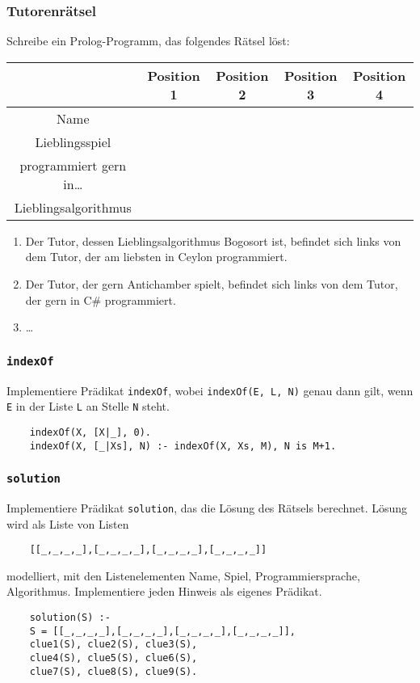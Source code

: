 \documentclass{beamer}
\date{2017-01-16/17}
\begin{document}
\normalsize
\normalem

\begin{frame}[plain]
  \titlepage
\end{frame}

\begin{frame}
  \frametitle{Tutorenrätsel}
  Schreibe ein Prolog-Programm, das folgendes Rätsel löst:
  \begin{table}
    \begin{tabular}{|c|c|c|c|c|}\hline
      & Position 1 & Position 2 & Position 3 & Position 4 \\\hline
      Name &&&& \\\hline
      Lieblingsspiel &&&& \\\hline
      programmiert gern in… &&&& \\\hline
      Lieblingsalgorithmus &&&& \\\hline
    \end{tabular}
  \end{table}
  \begin{enumerate}
  \item Der Tutor, dessen Lieblingsalgorithmus Bogosort ist, befindet sich links von dem Tutor, der am liebsten in Ceylon programmiert.
  \item Der Tutor, der gern Antichamber spielt, befindet sich links von dem Tutor, der gern in C\# programmiert.
  \item …
  \end{enumerate}
\end{frame}

\begin{frame}[fragile]
  \prolog
  \frametitle{\lstinline{indexOf}}
  Implementiere Prädikat \lstinline{indexOf},
  wobei \lstinline{indexOf(E, L, N)} genau dann gilt,
  wenn \lstinline{E} in der Liste \lstinline{L} an Stelle \lstinline{N} steht.
  \pause
  \begin{lstlisting}
    indexOf(X, [X|_], 0).
    indexOf(X, [_|Xs], N) :- indexOf(X, Xs, M), N is M+1.
  \end{lstlisting}
\end{frame}

\begin{frame}[fragile]
  \prolog
  \frametitle{\lstinline{solution}}
  Implementiere Prädikat \lstinline{solution},
  das die Lösung des Rätsels berechnet.
  Lösung wird als Liste von Listen
  \begin{lstlisting}
    [[_,_,_,_],[_,_,_,_],[_,_,_,_],[_,_,_,_]]
  \end{lstlisting}
  modelliert,
  mit den Listenelementen Name, Spiel, Programmiersprache, Algorithmus.
  Implementiere jeden Hinweis als eigenes Prädikat.
  \pause
  \begin{lstlisting}
    solution(S) :-
    S = [[_,_,_,_],[_,_,_,_],[_,_,_,_],[_,_,_,_]],
    clue1(S), clue2(S), clue3(S),
    clue4(S), clue5(S), clue6(S),
    clue7(S), clue8(S), clue9(S).
  \end{lstlisting}
\end{frame}
\end{document}
